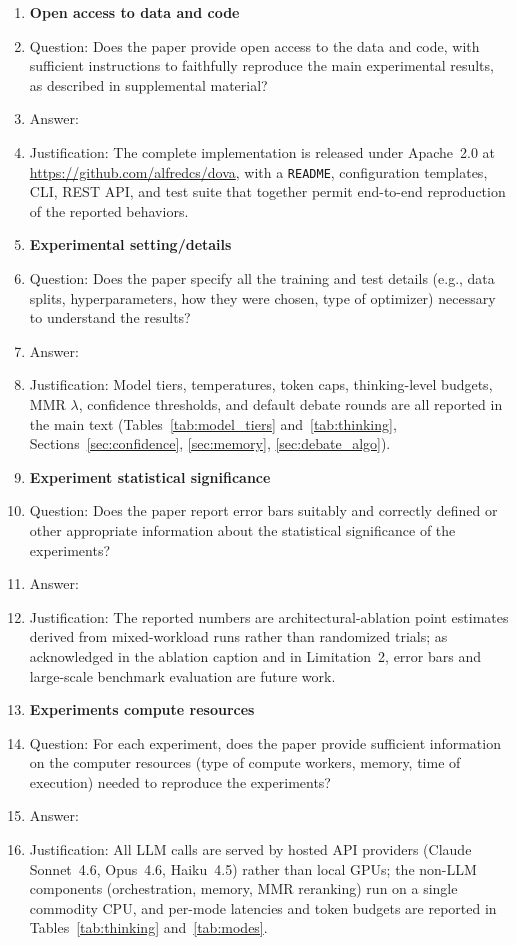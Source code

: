\documentclass{article}
\theoremstyle{plain}
\theoremstyle{definition}
\begin{document}
\begin{enumerate}
\item {\bf Open access to data and code}
    \item[] Question: Does the paper provide open access to the data and code, with sufficient instructions to faithfully reproduce the main experimental results, as described in supplemental material?
    \item[] Answer: \answerYes{}
    \item[] Justification: The complete implementation is released under Apache~2.0 at \url{https://github.com/alfredcs/dova}, with a \texttt{README}, configuration templates, CLI, REST API, and test suite that together permit end-to-end reproduction of the reported behaviors.

\item {\bf Experimental setting/details}
    \item[] Question: Does the paper specify all the training and test details (e.g., data splits, hyperparameters, how they were chosen, type of optimizer) necessary to understand the results?
    \item[] Answer: \answerYes{}
    \item[] Justification: Model tiers, temperatures, token caps, thinking-level budgets, MMR $\lambda$, confidence thresholds, and default debate rounds are all reported in the main text (Tables~\ref{tab:model_tiers} and~\ref{tab:thinking}, Sections~\ref{sec:confidence}, \ref{sec:memory}, \ref{sec:debate_algo}).

\item {\bf Experiment statistical significance}
    \item[] Question: Does the paper report error bars suitably and correctly defined or other appropriate information about the statistical significance of the experiments?
    \item[] Answer: \answerNo{}
    \item[] Justification: The reported numbers are architectural-ablation point estimates derived from mixed-workload runs rather than randomized trials; as acknowledged in the ablation caption and in Limitation~2, error bars and large-scale benchmark evaluation are future work.

\item {\bf Experiments compute resources}
    \item[] Question: For each experiment, does the paper provide sufficient information on the computer resources (type of compute workers, memory, time of execution) needed to reproduce the experiments?
    \item[] Answer: \answerYes{}
    \item[] Justification: All LLM calls are served by hosted API providers (Claude Sonnet~4.6, Opus~4.6, Haiku~4.5) rather than local GPUs; the non-LLM components (orchestration, memory, MMR reranking) run on a single commodity CPU, and per-mode latencies and token budgets are reported in Tables~\ref{tab:thinking} and~\ref{tab:modes}.


\end{enumerate}
\end{document}
